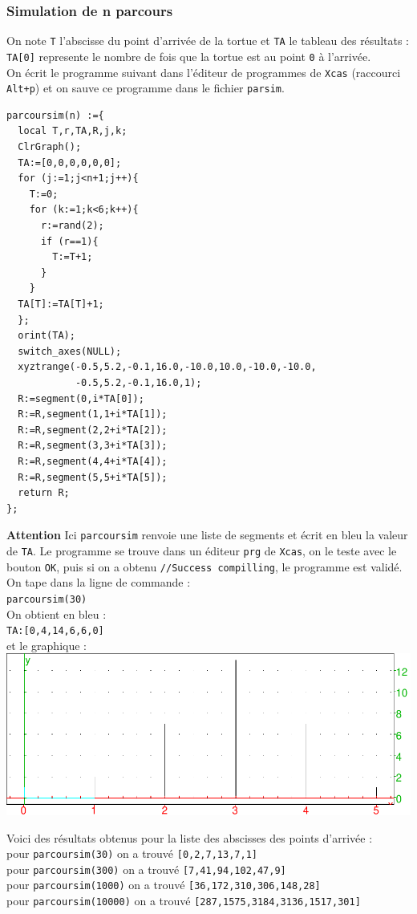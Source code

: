 \documentclass[a4paper,11pt]{book}
\begin{document}
\subsubsection{Simulation de n  parcours}
On note {\tt T} l'abscisse du point d'arriv\'ee de la tortue et 
{\tt TA} le tableau des r\'esultats : {\tt TA[0]} represente le nombre de fois 
que la tortue est au point {\tt 0} \`a l'arriv\'ee.\\
On \'ecrit  le programme suivant  dans l'\'editeur de programmes de {\tt Xcas} 
(raccourci {\tt Alt+p})
et on sauve ce programme dans le fichier {\tt parsim}.
\begin{verbatim}
parcoursim(n) :={
  local T,r,TA,R,j,k;
  ClrGraph();
  TA:=[0,0,0,0,0,0];
  for (j:=1;j<n+1;j++){
    T:=0;
    for (k:=1;k<6;k++){ 
      r:=rand(2);
      if (r==1){
        T:=T+1;
      }
    }
  TA[T]:=TA[T]+1;
  };
  orint(TA);
  switch_axes(NULL);
  xyztrange(-0.5,5.2,-0.1,16.0,-10.0,10.0,-10.0,-10.0,
            -0.5,5.2,-0.1,16.0,1);
  R:=segment(0,i*TA[0]);	
  R:=R,segment(1,1+i*TA[1]);
  R:=R,segment(2,2+i*TA[2]);
  R:=R,segment(3,3+i*TA[3]);
  R:=R,segment(4,4+i*TA[4]);
  R:=R,segment(5,5+i*TA[5]);
  return R;
}; 
\end{verbatim} 
{\bf Attention}
Ici {\tt parcoursim} renvoie une liste de  segments et \'ecrit en bleu la valeur de {\tt TA}.
Le programme se trouve dans un  \'editeur {\tt prg} de {\tt Xcas}, on le teste
avec  le bouton {\tt OK}, puis si on a obtenu {\tt  //Success compilling}, 
le programme est valid\'e.\\
On tape dans la ligne de commande :\\
{\tt parcoursim(30)}\\
On obtient en bleu :\\
{\tt TA:[0,4,14,6,6,0]}\\
et le graphique :\\

\includegraphics[width=\textwidth]{parsim}

Voici des r\'esultats obtenus pour la liste des abscisses des points 
d'arriv\'ee :\\
pour {\tt parcoursim(30)} on a trouv\'e {\tt [0,2,7,13,7,1]}\\
pour {\tt parcoursim(300)} on a trouv\'e {\tt [7,41,94,102,47,9]}\\
pour {\tt parcoursim(1000)} on a trouv\'e {\tt [36,172,310,306,148,28]}\\
pour {\tt parcoursim(10000)} on a trouv\'e {\tt [287,1575,3184,3136,1517,301]}
\end{document}
